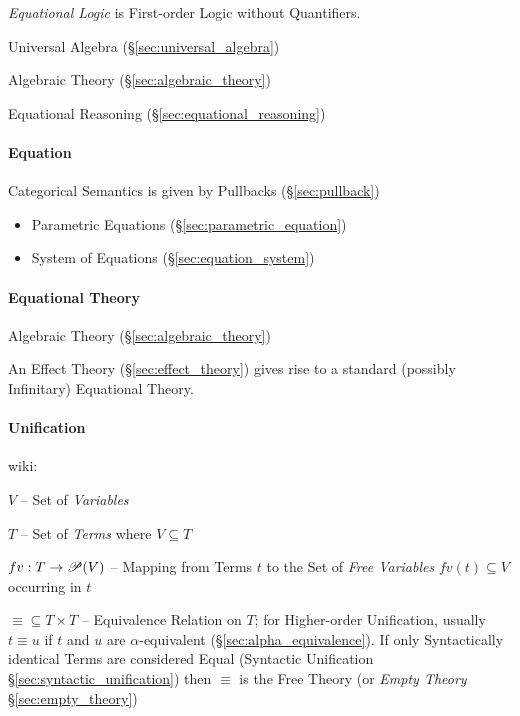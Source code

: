 \emph{Equational Logic} is First-order Logic without Quantifiers.

Universal Algebra (\S\ref{sec:universal_algebra})

Algebraic Theory (\S\ref{sec:algebraic_theory})

Equational Reasoning (\S\ref{sec:equational_reasoning})



\paragraph{Equation}\label{sec:equation}\hfill


Categorical Semantics is given by Pullbacks (\S\ref{sec:pullback})

\begin{itemize}
  \item Parametric Equations (\S\ref{sec:parametric_equation})
  \item System of Equations (\S\ref{sec:equation_system})
\end{itemize}



\paragraph{Equational Theory}\label{sec:equational_theory}\hfill

Algebraic Theory (\S\ref{sec:algebraic_theory})

An Effect Theory (\S\ref{sec:effect_theory}) gives rise to a standard
(possibly Infinitary) Equational Theory. \cite{plotkin-pretnar09}



\paragraph{Unification}\label{sec:unification}\hfill

wiki:

$V$ -- Set of \emph{Variables}

$T$ -- Set of \emph{Terms} where $V \subseteq T$

$fv : T \rightarrow \mathscr{P}(V)$ -- Mapping from Terms $t$ to the Set of
\emph{Free Variables} $fv(t) \subseteq V$ occurring in $t$

$\equiv \subseteq T \times T$ -- Equivalence Relation on $T$; for
Higher-order Unification, usually $t \equiv u$ if $t$ and $u$ are
$\alpha$-equivalent (\S\ref{sec:alpha_equivalence}). If only
Syntactically identical Terms are considered Equal (Syntactic
Unification \S\ref{sec:syntactic_unification}) then $\equiv$ is the
Free Theory (or \emph{Empty Theory} \S\ref{sec:empty_theory})


